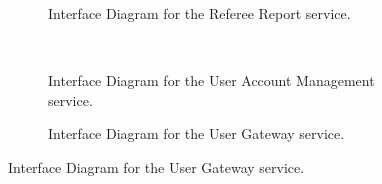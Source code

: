 \documentclass[12pt]{article}
\begin{document}
\begin{figure}[H]
\begin{subfigure}[H]{0.47\textwidth}
\centering	
{}
\caption{Interface Diagram for the Referee Report service.}
\end{subfigure}
~
\begin{subfigure}[H]{0.47\textwidth}
\centering	
{}
\caption{Interface Diagram for the User Account Management service.}
\end{subfigure}

\begin{subfigure}[H]{0.47\textwidth}
\centering	
{}
\caption{Interface Diagram for the User Gateway service.}
\end{subfigure}

\end{figure}
\newpage
\end{document}
